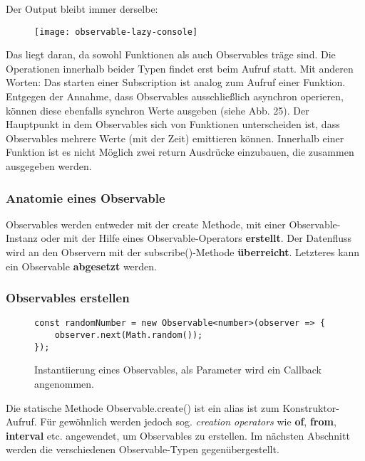 \noindent
Der Output bleibt immer derselbe:

\begin{figure}[H]
\begin{center}
\texttt{[image: observable-lazy-console]}
\end{center}
\end{figure}

\noindent
Das liegt daran, da sowohl Funktionen als auch Observables träge sind. Die Operationen innerhalb beider Typen findet erst beim Aufruf statt. Mit anderen Worten: Das starten einer Subscription ist analog zum Aufruf einer Funktion. Entgegen der Annahme, dass Observables ausschließlich asynchron operieren, können diese ebenfalls synchron Werte ausgeben (siehe Abb. 25).
Der Hauptpunkt in dem Observables sich von Funktionen unterscheiden ist, dass Observables mehrere Werte (mit der Zeit) emittieren können. Innerhalb einer Funktion ist es nicht Möglich zwei return Ausdrücke einzubauen, die zusammen ausgegeben werden.

\subsubsection{Anatomie eines Observable}
Observables werden entweder mit der create Methode, mit einer Observable-Instanz oder mit der Hilfe eines Observable-Operators \textbf{erstellt}. Der Datenfluss wird an den Observern mit der subscribe()-Methode \textbf{überreicht}. Letzteres kann ein Observable \textbf{abgesetzt} werden.

\subsubsection{Observables erstellen}

\begin{figure}[H]
\begin{lstlisting}[basicstyle=\small]
const randomNumber = new Observable<number>(observer => {
    observer.next(Math.random());
});
\end{lstlisting}
\caption{Instantiierung eines Observables, als Parameter wird ein Callback angenommen.}
\end{figure}

\noindent
Die statische Methode Observable.create() ist ein alias ist zum Konstruktor-Aufruf. Für gewöhnlich werden jedoch sog. \textit{creation operators} wie \textbf{of}, \textbf{from}, \textbf{interval} etc. angewendet, um Observables zu erstellen. Im nächsten Abschnitt werden die verschiedenen Observable-Typen gegenübergestellt.

